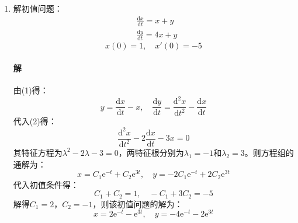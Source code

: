 \documentclass[fontset=none,openany,a4paper]{ctexbook}
\begin{document}
\begin{enumerate}
    \paragraph{解}

    原方程化为：
    \[
    \frac{\mathrm{d}y}{\mathrm{d}x} + \frac{2y}{x} - \frac{\sin x}{x} = 0
    \]
    该方程可以用常数变易法求解，首先解：
    \[
    \frac{\mathrm{d}y}{\mathrm{d}x} + \frac{2y}{x} = 0
    \]
    分离变量得：
    \[
    \frac{\mathrm{d}y}{y} = -\frac{2\mathrm{d}x}{x}
    \]
    积分得：
    \[
    y = \frac{C}{x^2}
    \]
    常数变易得：
    \[
    y = \frac{u(x)}{x^2},\quad \frac{\mathrm{d}y}{\mathrm{d}x} = \frac{u'(x)}{x^2} - \frac{2u(x)}{x^3}
    \]
    代入原方程：
    \[
    \frac{u'(x)}{x^2} - \frac{2u(x)}{x^3} + \frac{2u(x)}{x^3} - \sin x = 0
    \]
    即得：
    \[
    u'(x) = x\sin x
    \]
    分部积分得到：
    \begin{align*}
        u(x)
        &= \int x\sin x\,\mathrm{d}x \\
        &= -\int x\,\mathrm{d}\cos x \\
        &= \int \cos x\,\mathrm{d}\mathrm{e}^x - x\cos x \\
        &= \sin x - x\cos x + C
    \end{align*}
    解得：
    \[
    y = \frac{\sin x - x\cos x + C}{x^2}
    \]
    代入初值条件得：
    \[
    y(\pi) = \frac{\sin\pi - \pi\cos\pi + C}{\pi^2} = \frac{1}{\pi}
    \]
    解得$C=0$，则：
    \[
    y(x) = \frac{\sin x - x\cos x}{x^2}
    \]

    \item 解初值问题：
    \begin{align}
        &\frac{\mathrm{d}x}{\mathrm{d}t} = x + y \\
        &\frac{\mathrm{d}y}{\mathrm{d}t} = 4x + y
    \end{align}
    \[
    x(0) = 1,\quad x'(0) = -5
    \]

    \paragraph{解}

    由(1)得：
    \[
    y = \frac{\mathrm{d}x}{\mathrm{d}t} - x,\quad \frac{\mathrm{d}y}{\mathrm{d}t} = \frac{\mathrm{d}^2 x}{\mathrm{d}t^2} - \frac{\mathrm{d}x}{\mathrm{d}t}
    \]
    代入(2)得：
    \[
    \frac{\mathrm{d}^2 x}{\mathrm{d}t^2} - 2\frac{\mathrm{d}x}{\mathrm{d}t} - 3x = 0
    \]
    其特征方程为$\lambda^2-2\lambda-3=0$，两特征根分别为$\lambda_1=-1$和$\lambda_2=3$。则方程组的通解为：
    \[
    x = C_1\mathrm{e}^{-t} + C_2\mathrm{e}^{3t},\quad y = -2C_1\mathrm{e}^{-t} + 2C_2\mathrm{e}^{3t}
    \]
    代入初值条件得：
    \[
    C_1 + C_2 = 1,\quad -C_1 + 3C_2 = -5
    \]
    解得$C_1=2$，$C_2=-1$，则该初值问题的解为：
    \[
    x = 2\mathrm{e}^{-t} - \mathrm{e}^{3t},\quad y = -4\mathrm{e}^{-t} - 2\mathrm{e}^{3t}
    \]

\end{enumerate}
\end{document}
